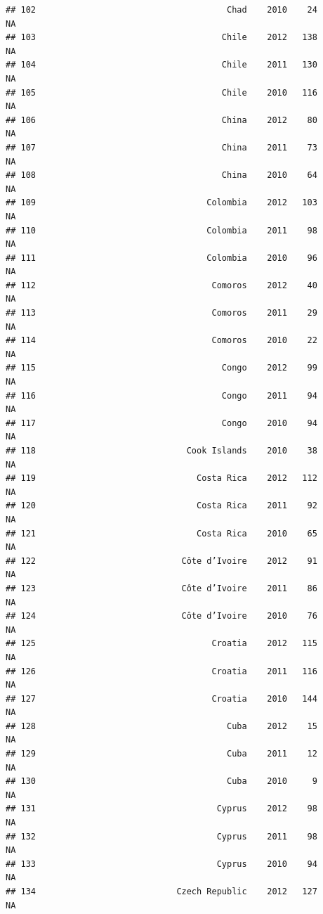 \documentclass[
]{book}
\begin{document}
\begin{verbatim}
## 102                                      Chad    2010    24              NA
## 103                                     Chile    2012   138              NA
## 104                                     Chile    2011   130              NA
## 105                                     Chile    2010   116              NA
## 106                                     China    2012    80              NA
## 107                                     China    2011    73              NA
## 108                                     China    2010    64              NA
## 109                                  Colombia    2012   103              NA
## 110                                  Colombia    2011    98              NA
## 111                                  Colombia    2010    96              NA
## 112                                   Comoros    2012    40              NA
## 113                                   Comoros    2011    29              NA
## 114                                   Comoros    2010    22              NA
## 115                                     Congo    2012    99              NA
## 116                                     Congo    2011    94              NA
## 117                                     Congo    2010    94              NA
## 118                              Cook Islands    2010    38              NA
## 119                                Costa Rica    2012   112              NA
## 120                                Costa Rica    2011    92              NA
## 121                                Costa Rica    2010    65              NA
## 122                             Côte d’Ivoire    2012    91              NA
## 123                             Côte d’Ivoire    2011    86              NA
## 124                             Côte d’Ivoire    2010    76              NA
## 125                                   Croatia    2012   115              NA
## 126                                   Croatia    2011   116              NA
## 127                                   Croatia    2010   144              NA
## 128                                      Cuba    2012    15              NA
## 129                                      Cuba    2011    12              NA
## 130                                      Cuba    2010     9              NA
## 131                                    Cyprus    2012    98              NA
## 132                                    Cyprus    2011    98              NA
## 133                                    Cyprus    2010    94              NA
## 134                            Czech Republic    2012   127              NA

\end{verbatim}
\end{document}
